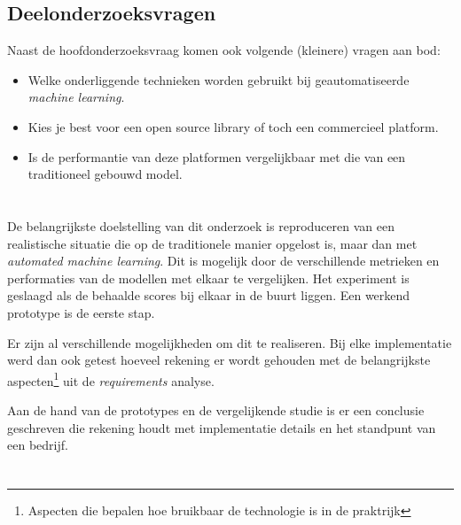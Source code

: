 \subsection{Deelonderzoeksvragen}
\label{subsec:deelonderzoeksvragen}

Naast de hoofdonderzoeksvraag komen ook volgende (kleinere) vragen aan bod:

\begin{itemize}
    \item Welke onderliggende technieken worden gebruikt bij geautomatiseerde \textit{machine learning}.
    \item Kies je best voor een open source library of toch een commercieel platform.
    \item Is de performantie van deze platformen vergelijkbaar met die van een traditioneel gebouwd model.
\end{itemize}

\section{}
\label{sec:onderzoeksdoelstelling}

De belangrijkste doelstelling van dit onderzoek is reproduceren van een realistische situatie die op de traditionele manier opgelost is, maar dan met \textit{automated machine learning}. Dit is mogelijk door de verschillende metrieken en performaties van de modellen met elkaar te vergelijken. Het experiment is geslaagd als de behaalde scores bij elkaar in de buurt liggen. Een werkend prototype is de eerste stap.

Er zijn al verschillende mogelijkheden om dit te realiseren. Bij elke implementatie werd dan ook getest hoeveel rekening er wordt gehouden met de belangrijkste aspecten\footnote{Aspecten die bepalen hoe bruikbaar de technologie is in de praktrijk} uit de \textit{requirements} analyse.

Aan de hand van de prototypes en de vergelijkende studie is er een conclusie geschreven die rekening houdt met implementatie details en het standpunt van een bedrijf.

\section{}
\label{sec:opzet-bachelorproef}


